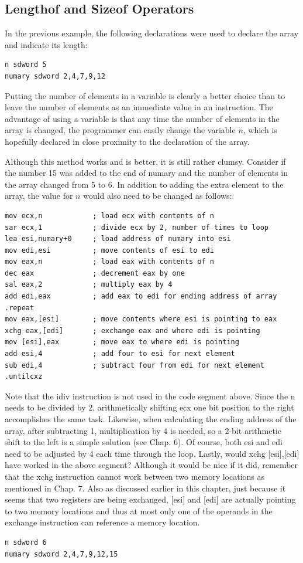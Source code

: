 \documentclass[10pt]{book}
\begin{document}
\subsection{Lengthof and Sizeof Operators}
In the previous example, the following declarations were used to declare the array and indicate its length:

\begin{verbatim}
n sdword 5
numary sdword 2,4,7,9,12
\end{verbatim}

Putting the number of elements in a variable is clearly a better choice than to leave the number of elements as an immediate value in an instruction. The advantage of using a variable is that any time the number of elements in the array is changed, the programmer can easily change the variable $n$, which is hopefully declared in close proximity to the declaration of the array.

Although this method works and is better, it is still rather clumsy. Consider if the number 15 was added to the end of numary and the number of elements in the array changed from 5 to 6. In addition to adding the extra element to the array, the value for $n$ would also need to be changed as follows:

\begin{verbatim}
mov ecx,n            ; load ecx with contents of n 
sar ecx,1            ; divide ecx by 2, number of times to loop
lea esi,numary+0     ; load address of numary into esi
mov edi,esi          ; move contents of esi to edi
mov eax,n            ; load eax with contents of n 
dec eax              ; decrement eax by one
sal eax,2            ; multiply eax by 4 
add edi,eax          ; add eax to edi for ending address of array
.repeat
mov eax,[esi]        ; move contents where esi is pointing to eax
xchg eax,[edi]       ; exchange eax and where edi is pointing
mov [esi],eax        ; move eax to where edi is pointing
add esi,4            ; add four to esi for next element
sub edi,4            ; subtract four from edi for next element
.untilcxz
\end{verbatim}

Note that the idiv instruction is not used in the code segment above. Since the n needs to be divided by 2, arithmetically shifting ecx one bit position to the right accomplishes the same task. Likewise, when calculating the ending address of the array, after subtracting 1, multiplication by 4 is needed, so a 2-bit arithmetic shift to the left is a simple solution (see Chap. 6). Of course, both esi and edi need to be adjusted by 4 each time through the loop. Lastly, would xchg [esi],[edi] have worked in the above segment? Although it would be nice if it did, remember that the xchg instruction cannot work between two memory locations as mentioned in Chap. 7. Also as discussed earlier in this chapter, just because it seems that two registers are being exchanged, [esi] and [edi] are actually pointing to two memory locations and thus at most only one of the operands in the exchange instruction can reference a memory location.
\begin{verbatim}
n sdword 6
numary sdword 2,4,7,9,12,15
\end{verbatim}
\end{document}
